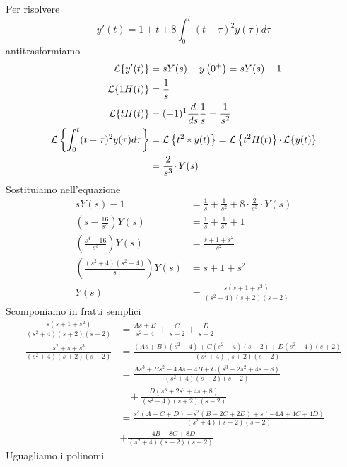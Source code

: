 Per risolvere
\begin{equation*}
y'( t) =1+t+8\int ^{t}_{0}( t-\tau )^{2} y( \tau ) d\tau 
\end{equation*}
antitrasformiamo
\begin{align*}
\mathcal{L}\{y'( t)\} & =sY( s) -y\left( 0^{+}\right) =sY( s) -1\\
\mathcal{L}\{1H( t)\} & =\frac{1}{s}\\
\mathcal{L}\{tH( t)\} & =( -1)^{1}\frac{d}{ds}\frac{1}{s} =\frac{1}{s^{2}}\\
\mathcal{L}\left\{\int ^{t}_{0}( t-\tau )^{2} y( \tau ) d\tau \right\} & =\mathcal{L}\left\{t^{2} *y( t)\right\} =\mathcal{L}\left\{t^{2} H( t)\right\} \cdotp \mathcal{L}\{y( t)\}\\
 & =\frac{2}{s^{3}} \cdotp Y( s)
\end{align*}
Sostituiamo nell'equazione
\begin{align*}
sY( s) -1 & =\frac{1}{s} +\frac{1}{s^{2}} +8\cdotp \frac{2}{s^{3}} \cdotp Y( s)\\
\left( s-\frac{16}{s^{3}}\right) Y( s) & =\frac{1}{s} +\frac{1}{s^{2}} +1\\
\left(\frac{s^{4} -16}{s^{3}}\right) Y( s) & =\frac{s+1+s^{2}}{s^{2}}\\
\left(\frac{\left( s^{2} +4\right)\left( s^{2} -4\right)}{s}\right) Y( s) & =s+1+s^{2}\\
Y( s) & =\frac{s\left( s+1+s^{2}\right)}{\left( s^{2} +4\right)( s+2)( s-2)}
\end{align*}
Scomponiamo in fratti semplici
\begin{align*}
\frac{s\left( s+1+s^{2}\right)}{\left( s^{2} +4\right)( s+2)( s-2)} & =\frac{As+B}{s^{2} +4} +\frac{C}{s+2} +\frac{D}{s-2}\\
\frac{s^{2} +s+s^{3}}{\left( s^{2} +4\right)( s+2)( s-2)} & =\frac{( As+B)\left( s^{2} -4\right) +C\left( s^{2} +4\right)( s-2) +D\left( s^{2} +4\right)( s+2)}{\left( s^{2} +4\right)( s+2)( s-2)}\\
 & =\frac{As^{3} +Bs^{2} -4As-4B+C\left( s^{3} -2s^{2} +4s-8\right)}{\left( s^{2} +4\right)( s+2)( s-2)}\\
 & \ \ \ \ +\frac{D\left( s^{3} +2s^{2} +4s+8\right)}{\left( s^{2} +4\right)( s+2)( s-2)}\\
 & =\frac{s^{3}( A+C+D) +s^{2}( B-2C+2D) +s( -4A+4C+4D)}{\left( s^{2} +4\right)( s+2)( s-2)}\\
 & +\frac{-4B-8C+8D}{\left( s^{2} +4\right)( s+2)( s-2)}
\end{align*}
Uguagliamo i polinomi
